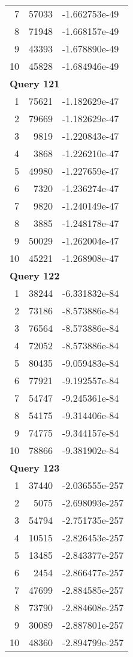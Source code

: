 \begin{longtable}[{p}]{@{}rrp{}@{}}
7 & 57033 & -1.662753e-49 \\
8 & 71948 & -1.668157e-49 \\
9 & 43393 & -1.678890e-49 \\
10 & 45828 & -1.684946e-49 \\
\midrule
\multicolumn{3}{l}{\bfseries Query 121} \\
1 & 75621 & -1.182629e-47 \\
2 & 79669 & -1.182629e-47 \\
3 & 9819 & -1.220843e-47 \\
4 & 3868 & -1.226210e-47 \\
5 & 49980 & -1.227659e-47 \\
6 & 7320 & -1.236274e-47 \\
7 & 9820 & -1.240149e-47 \\
8 & 3885 & -1.248178e-47 \\
9 & 50029 & -1.262004e-47 \\
10 & 45221 & -1.268908e-47 \\
\midrule
\multicolumn{3}{l}{\bfseries Query 122} \\
1 & 38244 & -6.331832e-84 \\
2 & 73186 & -8.573886e-84 \\
3 & 76564 & -8.573886e-84 \\
4 & 72052 & -8.573886e-84 \\
5 & 80435 & -9.059483e-84 \\
6 & 77921 & -9.192557e-84 \\
7 & 54747 & -9.245361e-84 \\
8 & 54175 & -9.314406e-84 \\
9 & 74775 & -9.344157e-84 \\
10 & 78866 & -9.381902e-84 \\
\midrule
\multicolumn{3}{l}{\bfseries Query 123} \\
1 & 37440 & -2.036555e-257 \\
2 & 5075 & -2.698093e-257 \\
3 & 54794 & -2.751735e-257 \\
4 & 10515 & -2.826453e-257 \\
5 & 13485 & -2.843377e-257 \\
6 & 2454 & -2.866477e-257 \\
7 & 47699 & -2.884585e-257 \\
8 & 73790 & -2.884608e-257 \\
9 & 30089 & -2.887801e-257 \\
10 & 48360 & -2.894799e-257 \\

\end{longtable}
